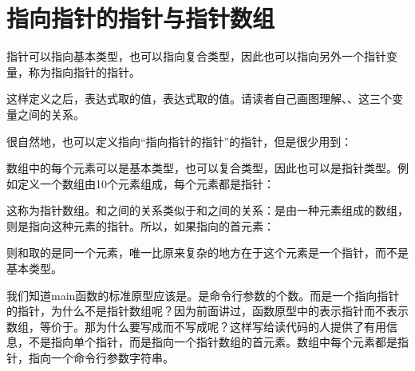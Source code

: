 \section{指向指针的指针与指针数组}
%
指针可以指向基本类型，也可以指向复合类型，因此也可以指向另外一个指针变量，称为指向指针的指针。




这样定义之后，表达式取的值，表达式取的值。请读者自己画图理解、、这三个变量之间的关系。



很自然地，也可以定义指向“指向指针的指针”的指针，但是很少用到：




数组中的每个元素可以是基本类型，也可以复合类型，因此也可以是指针类型。例如定义一个数组由10个元素组成，每个元素都是指针：




这称为指针数组。和之间的关系类似于和之间的关系：是由一种元素组成的数组，则是指向这种元素的指针。所以，如果指向的首元素：




则和取的是同一个元素，唯一比原来复杂的地方在于这个元素是一个指针，而不是基本类型。



我们知道main函数的标准原型应该是。是命令行参数的个数。而是一个指向指针的指针，为什么不是指针数组呢？因为前面讲过，函数原型中的\BookCode{[\BookSplit{}]\BookSplit{}}表示指针而不表示数组，等价于。那为什么要写成而不写成呢？这样写给读代码的人提供了有用信息，不是指向单个指针，而是指向一个指针数组的首元素。数组中每个元素都是指针，指向一个命令行参数字符串。


